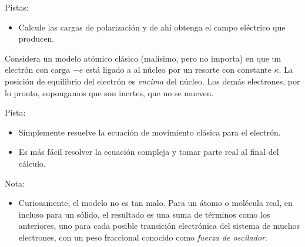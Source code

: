 \documentclass{exam}
\begin{document}
\begin{questions}
  Pistas:
  \begin{itemize}
  \item Calcule las cargas de polarización y de ahí obtenga el campo
    eléctrico que producen.
  \end{itemize}

  \question Considera un modelo atómico clásico (malísimo, pero no importa) en
  que un electrón con carga $-e$ está ligado a al núcleo por un
  resorte con constante $\kappa$. La posición de equilibrio del electrón
  es {\em encima} del núcleo. Los demás electrones, por lo pronto,
  supongamos que son inertes, que no se mueven.

  Pista:
  \begin{itemize}
  \item Simplemente resuelve la ecuación de movimiento clásica para el
    electrón.
  \item Es más fácil resolver la ecuación compleja y tomar parte real
    al final del cálculo.
  \end{itemize}
  Nota:
    \begin{itemize}
    \item Curiosamente, el modelo no es tan malo. Para un átomo o
      molécula real, en incluso para un sólido, el resultado es una suma de términos como los
      anteriores, uno para cada posible transición electrónica del
      sistema de muchos electrones, con un peso fraccional conocido
      como {\em fuerza de oscilador}.
    \end{itemize}


\end{questions}
\end{document}

